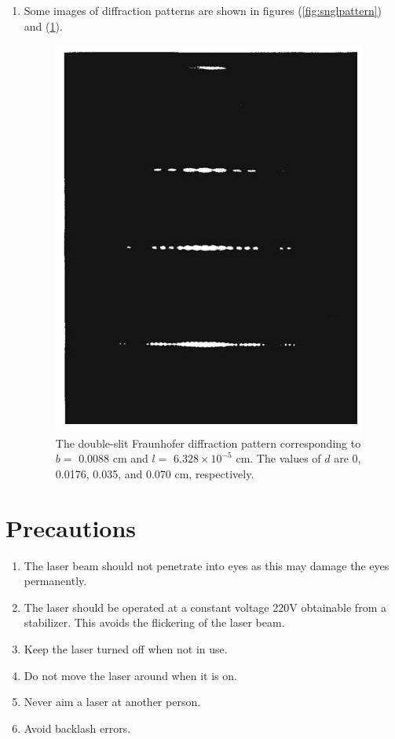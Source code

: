 \documentclass{article}
\begin{document}
\begin{enumerate}
    \item Some images of diffraction patterns are shown in figures (\ref{fig:snglpattern}) and (\ref{fig:dblpattern}).
        \begin{figure}[h!]
            \centering
            \includegraphics[scale = 0.4]{Figures/dblslitpattern.png}
            \caption{The double-slit Fraunhofer diffraction pattern corresponding to $b =$ 0.0088 cm and $l =$ $6.328 \times 10^{-5}$ cm. The values of $d$ are 0, 0.0176, 0.035, and 0.070 cm, respectively.}
            \label{fig:dblpattern}
        \end{figure}
\end{enumerate}

\section{Precautions}
\begin{enumerate}
    \item The laser beam should not penetrate into eyes as this may damage the eyes permanently.
    \item The laser should be operated at a constant voltage 220V obtainable from a stabilizer. This avoids the flickering of the laser beam.
    \item Keep the laser turned off when not in use.
    \item Do not move the laser around when it is on.
    \item Never aim a laser at another person.
    \item Avoid backlash errors.
\end{enumerate}
\end{document}
